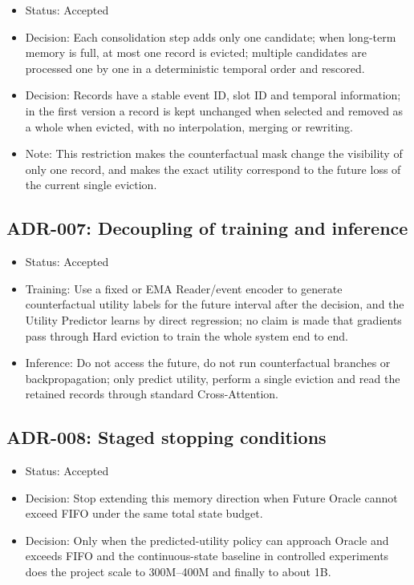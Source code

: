 \begin{itemize}
  \item Status: Accepted
  \item Decision: Each consolidation step adds only one candidate; when long-term memory is full, at most one record is evicted; multiple candidates are processed one by one in a deterministic temporal order and rescored.
  \item Decision: Records have a stable event ID, slot ID and temporal information; in the first version a record is kept unchanged when selected and removed as a whole when evicted, with no interpolation, merging or rewriting.
  \item Note: This restriction makes the counterfactual mask change the visibility of only one record, and makes the exact utility correspond to the future loss of the current single eviction.
\end{itemize}

\subsection*{ADR-007: Decoupling of training and inference}

\begin{itemize}
  \item Status: Accepted
  \item Training: Use a fixed or EMA Reader/event encoder to generate counterfactual utility labels for the future interval after the decision, and the Utility Predictor learns by direct regression; no claim is made that gradients pass through Hard eviction to train the whole system end to end.
  \item Inference: Do not access the future, do not run counterfactual branches or backpropagation; only predict utility, perform a single eviction and read the retained records through standard Cross-Attention.
\end{itemize}

\subsection*{ADR-008: Staged stopping conditions}

\begin{itemize}
  \item Status: Accepted
  \item Decision: Stop extending this memory direction when Future Oracle cannot exceed FIFO under the same total state budget.
  \item Decision: Only when the predicted-utility policy can approach Oracle and exceeds FIFO and the continuous-state baseline in controlled experiments does the project scale to 300M--400M and finally to about 1B.
\end{itemize}

